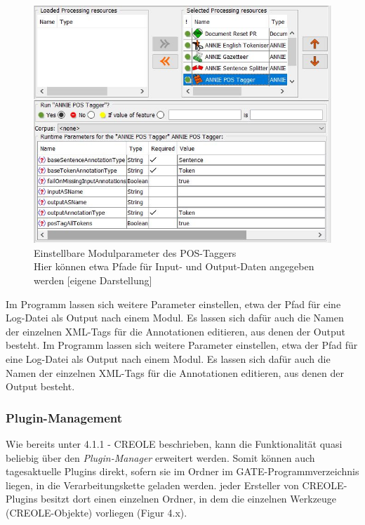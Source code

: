 \documentclass[12pt]{report}
\begin{document}
\begin{figure}[h!]
\begin{center}
\includegraphics[scale=0.8]{GATE_Bilder/POSTagger.jpg}
\caption{Einstellbare Modulparameter des POS-Taggers \\ Hier können etwa Pfade für Input- und Output-Daten angegeben werden [eigene Darstellung]}
\end{center}
\end{figure} 

Im Programm lassen sich weitere Parameter einstellen, etwa der Pfad für eine Log-Datei als Output nach einem Modul. Es lassen sich dafür auch die Namen der einzelnen XML-Tags für die Annotationen editieren, aus denen der Output besteht.
Im Programm lassen sich weitere Parameter einstellen, etwa der Pfad für eine Log-Datei als Output nach einem Modul. Es lassen sich dafür auch die Namen der einzelnen XML-Tags für die Annotationen editieren, aus denen der Output besteht.\\

\subsubsection{Plugin-Management}
Wie bereits unter 4.1.1 - CREOLE beschrieben, kann die Funktionalität quasi beliebig über den \textit{Plugin-Manager} erweitert werden. Somit können auch tagesaktuelle Plugins direkt, sofern sie im Ordner im GATE-Programmverzeichnis liegen, in die Verarbeitungskette geladen werden. jeder Ersteller von CREOLE-Plugins besitzt dort einen einzelnen Ordner, in dem die einzelnen Werkzeuge (CREOLE-Objekte) vorliegen (Figur 4.x). 
 
\end{document}
